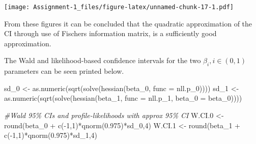 \documentclass[
]{article}
\newenvironment{Shaded}{\begin{snugshade}}{\end{snugshade}}
\newcommand{\AttributeTok}[1]{\textcolor[rgb]{0.77,0.63,0.00}{#1}}
\newcommand{\CommentTok}[1]{\textcolor[rgb]{0.56,0.35,0.01}{\textit{#1}}}
\newcommand{\DecValTok}[1]{\textcolor[rgb]{0.00,0.00,0.81}{#1}}
\newcommand{\FloatTok}[1]{\textcolor[rgb]{0.00,0.00,0.81}{#1}}
\newcommand{\FunctionTok}[1]{\textcolor[rgb]{0.00,0.00,0.00}{#1}}
\newcommand{\NormalTok}[1]{#1}
\newcommand{\OtherTok}[1]{\textcolor[rgb]{0.56,0.35,0.01}{#1}}
\newcommand{\SpecialCharTok}[1]{\textcolor[rgb]{0.00,0.00,0.00}{#1}}
\begin{document}
\texttt{[image: Assignment-1\_files/figure-latex/unnamed-chunk-17-1.pdf]}

From these figures it can be concluded that the quadratic approximation
of the CI through use of Fischers information matrix, is a sufficiently
good approximation.

The Wald and likelihood-based confidence intervals for the two
\(\beta_i, i\in (0,1)\) parameters can be seen printed below.

\begin{Shaded}
\begin{Highlighting}[]
\NormalTok{sd\_0 }\OtherTok{\textless{}{-}} \FunctionTok{as.numeric}\NormalTok{(}\FunctionTok{sqrt}\NormalTok{(}\FunctionTok{solve}\NormalTok{(}\FunctionTok{hessian}\NormalTok{(beta\_0, }\AttributeTok{func =}\NormalTok{ nll.p\_0))))}
\NormalTok{sd\_1 }\OtherTok{\textless{}{-}} \FunctionTok{as.numeric}\NormalTok{(}\FunctionTok{sqrt}\NormalTok{(}\FunctionTok{solve}\NormalTok{(}\FunctionTok{hessian}\NormalTok{(beta\_1, }\AttributeTok{func =}\NormalTok{ nll.p\_1, }\AttributeTok{beta\_0 =}\NormalTok{ beta\_0))))}

\CommentTok{\#Wald 95\% CIs and profile{-}likelihoods with approx 95\% CI}
\NormalTok{W.CI}\FloatTok{.0} \OtherTok{\textless{}{-}} \FunctionTok{round}\NormalTok{(beta\_0 }\SpecialCharTok{+} \FunctionTok{c}\NormalTok{(}\SpecialCharTok{{-}}\DecValTok{1}\NormalTok{,}\DecValTok{1}\NormalTok{)}\SpecialCharTok{*}\FunctionTok{qnorm}\NormalTok{(}\FloatTok{0.975}\NormalTok{)}\SpecialCharTok{*}\NormalTok{sd\_0,}\DecValTok{4}\NormalTok{)}
\NormalTok{W.CI}\FloatTok{.1} \OtherTok{\textless{}{-}} \FunctionTok{round}\NormalTok{(beta\_1 }\SpecialCharTok{+} \FunctionTok{c}\NormalTok{(}\SpecialCharTok{{-}}\DecValTok{1}\NormalTok{,}\DecValTok{1}\NormalTok{)}\SpecialCharTok{*}\FunctionTok{qnorm}\NormalTok{(}\FloatTok{0.975}\NormalTok{)}\SpecialCharTok{*}\NormalTok{sd\_1,}\DecValTok{4}\NormalTok{)}


\end{Highlighting}
\end{Shaded}
\end{document}
